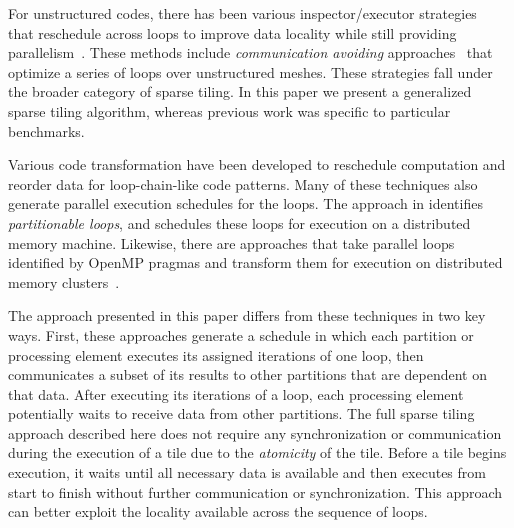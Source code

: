 For unstructured codes, there has been various
inspector/executor strategies~\cite{Saltz91}
that reschedule across loops to improve data locality
while still providing parallelism~\cite{dimeEtna00,StroutLCPC2002,Demmel08,KriegerIAAA2012}.
These methods include \emph{communication avoiding} approaches~\cite{commAvoidingSparse2009} 
that optimize a series of loops over unstructured meshes. 
These strategies fall under the broader category of sparse tiling.
In this paper we present a generalized sparse tiling algorithm, whereas 
previous work was specific to particular benchmarks.


Various code transformation have been developed to reschedule 
computation and reorder data for loop-chain-like code patterns.
Many of these techniques also generate parallel execution schedules for the loops. 
The approach in \cite{OhioStateMPICodeGen} identifies \emph{partitionable loops}, 
and schedules these loops for execution on a distributed memory machine. 
Likewise, there are approaches that take parallel loops identified by OpenMP 
pragmas and transform them for execution on distributed memory clusters~\cite{Basumallik2006}. 

The approach presented in this paper differs from these techniques in two key ways. 
First, these approaches generate a schedule in which each partition or processing 
element executes its assigned iterations of one loop, then communicates a subset 
of its results to other partitions that are dependent on that data. 
After executing its iterations of a loop, each processing element potentially 
waits to receive data from other partitions. 
The full sparse tiling approach described here does not require any 
synchronization or communication during the execution of a tile due to the \emph{atomicity} 
of the tile. Before a tile begins execution, it waits until all necessary data is available 
and then executes from start to finish without further communication or synchronization. 
This approach can better exploit the locality available across the sequence of loops.

